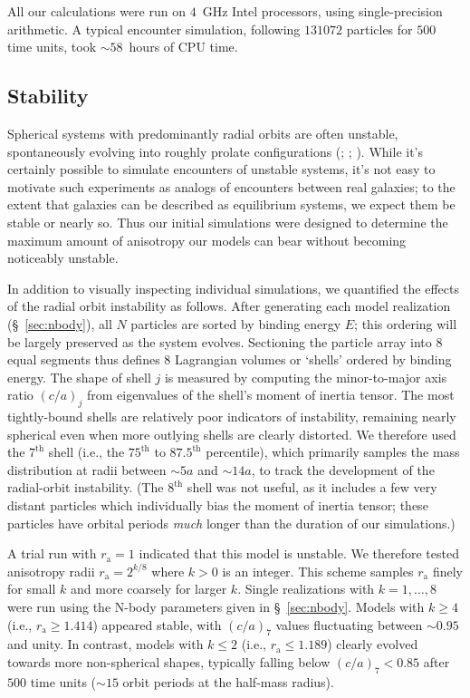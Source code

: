 \documentclass[fleqn,usenatbib]{mnras}
\begin{document}
All our calculations were run on $4$~GHz Intel processors, using single-precision arithmetic. A typical encounter simulation, following $131072$ particles for $500$ time units, took $\sim 58$~hours of CPU time.

\subsection{Stability}
\label{sec:stability}

Spherical systems with predominantly radial orbits are often unstable, spontaneously evolving into roughly prolate configurations (\citealt{Antonov1973}; \citealt{MA1985}; \citealt{BGH1986}). While it's certainly possible to simulate encounters of unstable systems, it's not easy to motivate such experiments as analogs of encounters between real galaxies; to the extent that galaxies can be described as equilibrium systems, we expect them be stable or nearly so. Thus our initial simulations were designed to determine the maximum amount of anisotropy our models can bear without becoming noticeably unstable. 

In addition to visually inspecting individual simulations, we quantified the effects of the radial orbit instability as follows. After generating each model realization (\S~\ref{sec:nbody}), all $N$ particles are sorted by binding energy $E$; this ordering will be largely preserved as the system evolves. Sectioning the particle array into $8$ equal segments thus defines $8$ Lagrangian volumes or `shells' ordered by binding energy. The shape of shell $j$ is measured by computing the minor-to-major axis ratio $(c/a)_{j}$ from eigenvalues of the shell's moment of inertia tensor. The most tightly-bound shells are relatively poor indicators of instability, remaining nearly spherical even when more outlying shells are clearly distorted. We therefore used the $7^\mathrm{th}$ shell (i.e., the $75^\mathrm{th}$ to $87.5^\mathrm{th}$ percentile), which primarily samples the mass distribution at radii between $\sim 5 a$ and $\sim 14 a$, to track the development of the radial-orbit instability. (The $8^\mathrm{th}$ shell was not useful, as it includes a few very distant particles which individually bias the moment of inertia tensor; these particles have orbital periods \textit{much} longer than the duration of our simulations.) 

A trial run with $r_\mathrm{a} = 1$ indicated that this model is unstable. We therefore tested anisotropy radii $r_\mathrm{a} = 2^{k/8}$ where $k > 0$ is an integer. This scheme samples $r_\mathrm{a}$ finely for small $k$ and more coarsely for larger $k$. Single realizations with $k = 1, \dots, 8$ were run using the N-body parameters given in \S~\ref{sec:nbody}. Models with $k \ge 4$ (i.e., $r_\mathrm{a} \ge 1.414$) appeared stable, with $(c/a)_{7}$ values fluctuating between $\sim 0.95$ and unity. In contrast, models with $k \le 2$ (i.e., $r_\mathrm{a} \le 1.189$) clearly evolved towards more non-spherical shapes, typically falling below $(c/a)_{7} < 0.85$ after $500$ time units ($\sim 15$ orbit periods at the half-mass radius).
\end{document}
